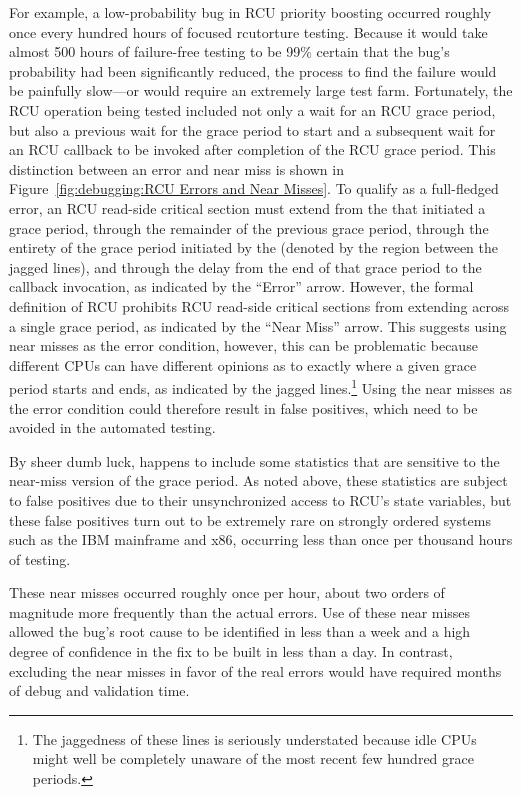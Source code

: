 For example, a low-probability bug in RCU priority boosting occurred
roughly once every hundred hours of focused rcutorture testing.
Because it would take almost 500 hours of failure-free testing to be
99\% certain that the bug's probability had been significantly reduced,
the  process
to find the failure would be painfully slow---or would require an extremely
large test farm.
Fortunately, the RCU operation being tested included not only a wait for
an RCU grace period, but also a previous wait for the grace period to start
and a subsequent wait for an RCU callback to be
invoked after completion of the RCU grace period.
This distinction between an  error and near miss is
shown in
Figure~\ref{fig:debugging:RCU Errors and Near Misses}.
To qualify as a full-fledged error, an RCU read-side critical section
must extend from the  that initiated a grace period,
through the remainder of the previous grace period, through the
entirety of the grace period initiated by the 
(denoted by the region between the jagged lines), and
through the delay from the end of that grace period to the callback
invocation, as indicated by the ``Error'' arrow.
However, the formal definition of RCU prohibits RCU read-side critical
sections from extending across a single grace period, as indicated by
the ``Near Miss'' arrow.
This suggests using near misses as the error condition, however, this
can be problematic because different CPUs can have different opinions
as to exactly where a given
grace period starts and ends, as indicated by the jagged lines.\footnote{
	The jaggedness of these lines is seriously understated because
	idle CPUs might well be completely unaware of the most recent
	few hundred grace periods.}
Using the near misses as the error condition could therefore result
in false positives, which need to be avoided in the automated
 testing.

By sheer dumb luck,  happens to include some statistics that
are sensitive to the near-miss version of the grace period.
As noted above, these statistics are subject to false positives due to
their unsynchronized access to RCU's state variables,
but these false positives turn out to be extremely rare on strongly
ordered systems such as the IBM mainframe and x86, occurring less than
once per thousand hours of testing.

These near misses occurred roughly once per hour, about two orders of
magnitude more frequently than the actual errors.
Use of these near misses allowed the bug's root cause to be identified
in less than a week and a high degree of confidence in the fix to be
built in less than a day.
In contrast, excluding the near misses in favor of the real errors would
have required months of debug and validation time.

